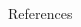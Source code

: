 \documentclass[final,hyperref={pdfpagelabels=true}]{beamer}
\newenvironment{postit}
{\begin{beamercolorbox}[sep=1em,wd=7cm]{postit}}
{\end{beamercolorbox}}
\begin{document}
\begin{frame}
\begin{columns}[t]
\begin{column}{.45\textwidth}
\begin{block}{References}
\begin{thebibliography}{999}

				\end{thebibliography}
			\end{block}
		\end{column}
	\end{columns}


\end{frame}
\end{document}
